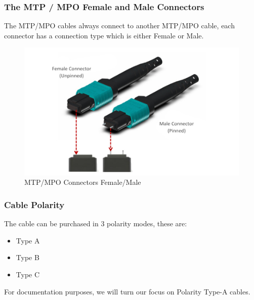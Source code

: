 \newpage
\subsubsection{The MTP / MPO Female and Male Connectors}

The MTP/MPO cables always connect to another MTP/MPO cable, each connector has a connection type which is either Female or Male.

\begin{figure}
  \includegraphics[width=\textwidth]{images/5.jpeg}
  \caption{MTP/MPO Connectors Female/Male}
\end{figure}

\newpage 
\subsubsection{Cable Polarity}

  The cable can be purchased in 3 polarity modes, these are:

  \begin{itemize}
      \item Type A
      \item Type B
      \item Type C
  \end{itemize}

  For documentation purposes, we will turn our focus on Polarity Type-A cables.

